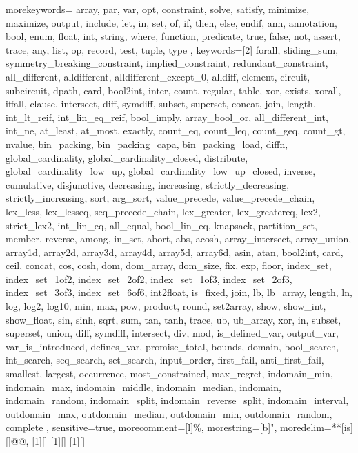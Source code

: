 {
  morekeywords={
  array, par, var, opt, constraint, solve, satisfy, minimize,
  maximize, output, include, let, in, set, of, if, then, else, endif,
  ann, annotation, bool, enum, float, int, string, where, function,
  predicate, true, false, not, assert, trace,
  any, list, op, record, test, tuple, type
  },
  keywords=[2]{
  forall, sliding_sum, symmetry_breaking_constraint,
  implied_constraint, redundant_constraint, all_different,
  alldifferent, alldifferent_except_0, alldiff, element, circuit,
  subcircuit, dpath, card, bool2int, inter, count, regular, table, xor,
  exists, xorall, iffall, clause, intersect, diff, symdiff, subset,
  superset, concat, join, length, int_lt_reif, int_lin_eq_reif,
  bool_imply, array_bool_or, all_different_int, int_ne, at_least,
  at_most, exactly, count_eq, count_leq, count_geq, count_gt, nvalue,
  bin_packing, bin_packing_capa, bin_packing_load, diffn,
  global_cardinality, global_cardinality_closed, distribute,
  global_cardinality_low_up, global_cardinality_low_up_closed,
  inverse, cumulative, disjunctive, decreasing, increasing,
  strictly_decreasing, strictly_increasing, sort,
  arg_sort, value_precede, value_precede_chain, lex_less, lex_lesseq, seq_precede_chain,
  lex_greater, lex_greatereq, lex2, strict_lex2, int_lin_eq, all_equal,
  bool_lin_eq, knapsack, partition_set, member, reverse, among, in_set,
  abort, abs, acosh, array_intersect, array_union, array1d, array2d,
  array3d, array4d, array5d, array6d, asin, atan, bool2int, card,
  ceil, concat, cos, cosh, dom, dom_array, dom_size, fix, exp, floor,
  index_set, index_set_1of2, index_set_2of2, index_set_1of3,
  index_set_2of3, index_set_3of3, index_set_6of6, int2float, is_fixed,
  join, lb, lb_array, length, ln, log, log2, log10, min, max, pow,
  product, round, set2array, show, show_int, show_float, sin, sinh,
  sqrt, sum, tan, tanh, trace, ub, ub_array, xor, in, subset,
  superset, union, diff, symdiff, intersect, div, mod,
  is_defined_var, output_var, var_is_introduced, defines_var,
  promise_total, bounds, domain, bool_search, int_search, seq_search,
  set_search, input_order, first_fail, anti_first_fail, smallest,
  largest, occurrence, most_constrained, max_regret, indomain_min,
  indomain_max, indomain_middle, indomain_median, indomain,
  indomain_random, indomain_split, indomain_reverse_split,
  indomain_interval, outdomain_max, outdomain_median, outdomain_min,
  outdomain_random, complete
  },
  sensitive=true,
  morecomment=[l]{\%},
  morestring=[b]",
  moredelim=**[is][\color{Melon}]{@}{@},
}
[1][]{\lstset{language=Mzn,style=mzn,#1}}{}
[1][]{\lstset{language=Mzn,style=mzn,style=nonumbers,#1}}{}
[1][]{\noindent\lstset{language=Mzn,style=mzn,style=nonumbers,#1}\minipage{\textwidth}}{\endminipage}

